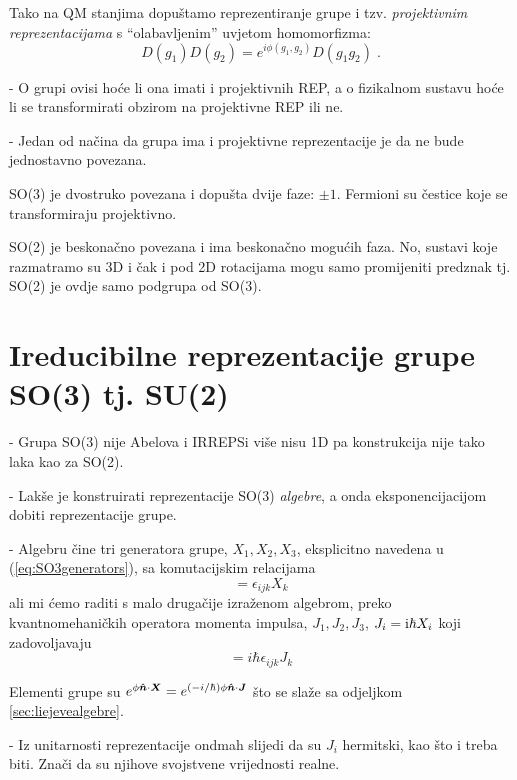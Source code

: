 Tako na QM stanjima dopuštamo reprezentiranje grupe i tzv.
\emph{projektivnim reprezentacijama} s ``olabavljenim'' uvjetom homomorfizma:
\begin{displaymath}
   D(g_1)D(g_2)=e^{i \phi(g_1,g_2)}D(g_1 g_2) \;.
\end{displaymath}

- O grupi ovisi hoće li ona imati i projektivnih REP, a o fizikalnom
sustavu hoće li se transformirati obzirom na projektivne REP ili ne.

- Jedan od načina da grupa ima i projektivne reprezentacije je da
  ne bude jednostavno povezana.

SO(3) je dvostruko povezana i dopušta dvije faze: $\pm 1$. Fermioni
su čestice koje se transformiraju projektivno.

SO(2) je beskonačno povezana i ima beskonačno mogućih faza. No, sustavi
koje razmatramo su 3D i čak i pod 2D rotacijama mogu samo promijeniti
predznak tj. SO(2) je ovdje samo podgrupa od SO(3).

\section{Ireducibilne reprezentacije grupe SO(3) tj. SU(2)}

- Grupa SO(3) nije Abelova i IRREPSi više nisu 1D pa konstrukcija nije
tako laka kao za SO(2).

- Lakše je konstruirati reprezentacije SO(3) \emph{algebre}, a onda
  eksponencijacijom dobiti reprezentacije grupe.

- Algebru čine tri generatora grupe, $X_1, X_2, X_3$, eksplicitno navedena u
(\ref{eq:SO3generators}), sa komutacijskim relacijama
\begin{equation}
          [X_i, X_j] = \epsilon_{ijk} X_k
\end{equation}
ali mi ćemo raditi s malo drugačije izraženom algebrom, preko kvantnomehaničkih operatora
momenta impulsa, $J_1, J_2, J_3$, $J_i=\textrm{i} \hbar X_i$ koji zadovoljavaju
\begin{equation}
          [J_i, J_j] = i \hbar \epsilon_{ijk} J_k
\label{eq:SU2algebra}
\end{equation}
 
Elementi grupe su $e^{\phi\unitn\cdot\vec{X}}=e^{(-i/\hbar)\phi\unitn\cdot
 \vec{J}}$ što se slaže sa odjeljkom \ref{sec:liejevealgebre}.

- Iz unitarnosti reprezentacije ondmah slijedi da su $J_i$ hermitski, kao
  što i treba biti. Znači da su njihove svojstvene vrijednosti realne.

